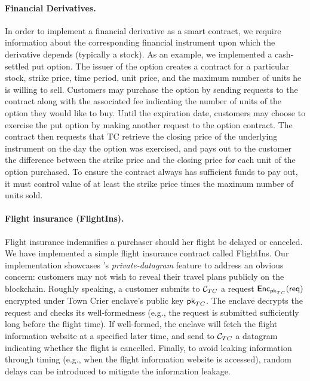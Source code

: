 \paragraph{Financial Derivatives.}  In order to implement a financial derivative as a smart contract, we require information about the corresponding financial instrument upon which the derivative depends (typically a stock).  As an example, we implemented a cash-settled put option.  The issuer of the option creates a contract for a particular stock, strike price, time period, unit price, and the maximum number of units he is willing to sell.  Customers may purchase the option by sending requests to the contract along with the associated fee indicating the number of units of the option they would like to buy.  Until the expiration date, customers may choose to exercise the put option by making another request to the option contract.  The contract then requests that TC retrieve the closing price of the underlying instrument on the day the option was exercised, and pays out to the customer the difference between the strike price and the closing price for each unit of the option purchased.  To ensure the contract always has sufficient funds to pay out, it must control value of at least the strike price times the maximum number of units sold.
\fi

\paragraph{Flight insurance ({\sf FlightIns}).}
Flight insurance indemnifies a purchaser should her flight be delayed or canceled.
We have implemented a simple flight insurance contract called {\sf FlightIns}.
Our implementation showcases \tc's {\it private-datagram} feature to address an obvious concern:
customers may not wish to reveal their travel plans publicly on the blockchain. 
Roughly speaking, 
a customer submits to ${\cal C}_{TC}$ a 
request ${\sf Enc}_{{\sf pk}_{TC}}({\sf req})$ 
encrypted under Town Crier enclave's public 
key ${\sf pk}_{TC}$. The enclave decrypts
the request and checks its well-formedness (e.g., the request is submitted
sufficiently long before the flight time).
If well-formed, the enclave will fetch the flight information website
at a specified later time, and send to ${\cal C}_{TC}$ a datagram indicating
whether the flight is cancelled. 
Finally, to avoid leaking information through timing (e.g.,
when the flight 
information website is accessed), random delays can be introduced to mitigate
the information leakage. 


